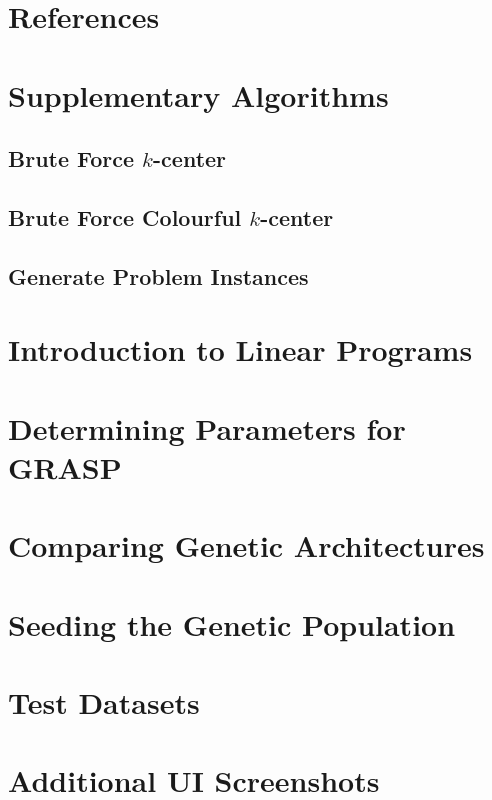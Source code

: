 \documentclass{article}
\begin{document}
\newpage
\section{References}
\sloppy{\printbibliography[heading=none]}

\newpage
\appendix
\section{Supplementary Algorithms}\label{appendix:algorithms}
    \subsection{Brute Force \texorpdfstring{$k$}{k}-center}
        \label{brute-force-k-center}
        
    \subsection{Brute Force Colourful \texorpdfstring{$k$}{k}-center}
        \label{brute-force-colourful-k-center}
        
    \subsection{Generate Problem Instances}\label{appendix:generate_problem_instances}
        

\section{Introduction to Linear Programs}
    \label{appendix:lp_intro}
            

\section{Determining Parameters for GRASP}\label{appendix:grasp_param}
    
    
\section{Comparing Genetic Architectures}\label{appendix:genetic_architectures}
    
\newpage    
\section{Seeding the Genetic Population}\label{appendix:seed_population}
    

\section{Test Datasets}\label{appendix:test_datasets}
    

\newpage    
\section{Additional UI Screenshots}\label{appendix:learn}
    

\newpage
\printglossaries

\end{document}
